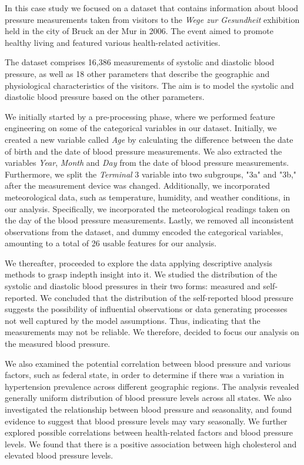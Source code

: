 \documentclass[12 pt]{scrartcl}
\numberwithin{equation}{section}
\begin{document}
In this case study we focused on a dataset that contains information about 
blood pressure measurements taken from visitors to the \textit{Wege zur Gesundheit} 
exhibition held in the city of Bruck an der Mur in 2006.
The event aimed to promote healthy living and featured various health-related activities.

The dataset comprises 16,386 measurements of systolic and diastolic blood pressure, 
as well as 18 other parameters that describe the geographic and physiological characteristics 
of the visitors. The aim is to model the systolic and diastolic blood pressure based on the
other parameters.

We initially started by a pre-processing phase, 
where we performed feature engineering on some of the categorical variables in our dataset.
Initially, we created a new variable called \textit{Age} by calculating the difference 
between the date of birth and the date of blood pressure measurements.
We also extracted the variables \textit{Year}, \textit{Month} and \textit{Day} from the date of blood pressure measurements.
Furthermore, we split the \textit{Terminal} 3 variable into two subgroups, "3a" and "3b," after the measurement device was changed.
Additionally, we incorporated meteorological data, such as temperature, humidity, and weather conditions, 
in our analysis. Specifically, we incorporated the meteorological readings taken on the day of the blood pressure measurements.
Lastly, we removed all inconsistent observations from the dataset, and dummy encoded the categorical variables,
amounting to a total of 26 usable features for our analysis.


We thereafter, proceeded to explore the data applying descriptive analysis methods to grasp indepth insight into it.
We studied the distribution of the systolic and diastolic blood pressures in their two forms: 
measured and self-reported. We concluded that
the distribution of the self-reported blood pressure suggests the possibility of influential observations or data generating processes 
not well captured by the model assumptions.
Thus, indicating that the measurements may not be reliable. We therefore, decided to focus our analysis on the measured blood pressure.

We also examined the potential correlation between blood pressure and various factors, 
such as federal state, in order to determine if there was a variation in hypertension prevalence across different geographic regions.
The analysis revealed generally uniform distribution of blood pressure levels across all states.
We also investigated the relationship between blood pressure and seasonality, and found evidence to suggest that blood pressure levels may vary seasonally.
We further explored possible correlations between health-related factors and blood pressure levels.
We found that there is a positive association between high cholesterol and elevated blood pressure levels.   
\end{document}
